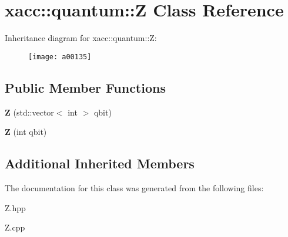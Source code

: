 \hypertarget{a00135}{}\section{xacc\+:\+:quantum\+:\+:Z Class Reference}
\label{a00135}
Inheritance diagram for xacc\+:\+:quantum\+:\+:Z\+:\begin{figure}[H]
\begin{center}
\leavevmode
\texttt{[image: a00135]}
\end{center}
\end{figure}
\subsection*{Public Member Functions}
\begin{DoxyCompactItemize}
\item 
{\bfseries Z} (std\+::vector$<$ int $>$ qbit)\hypertarget{a00135_a5f1d311b357faed8c2665fe20cf24aeb}{}\label{a00135_a5f1d311b357faed8c2665fe20cf24aeb}

\item 
{\bfseries Z} (int qbit)\hypertarget{a00135_aa1bb7e533e7595e9ecd06879a2f8d2de}{}\label{a00135_aa1bb7e533e7595e9ecd06879a2f8d2de}

\end{DoxyCompactItemize}
\subsection*{Additional Inherited Members}


The documentation for this class was generated from the following files\+:\begin{DoxyCompactItemize}
\item 
Z.\+hpp\item 
Z.\+cpp\end{DoxyCompactItemize}
